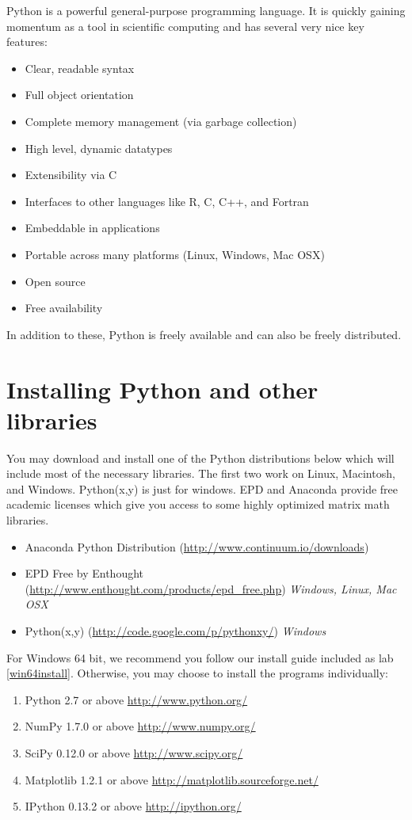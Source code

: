 \label{lab:Essential_Python}

Python is a powerful general-purpose programming language.
It is quickly gaining momentum as a tool in scientific computing and has several very
nice key features:
\begin{itemize}
\item Clear, readable syntax
\item Full object orientation
\item Complete memory management (via garbage collection)
\item High level, dynamic datatypes
\item Extensibility via C
\item Interfaces to other languages like R, C, C++, and Fortran
\item Embeddable in applications
\item Portable across many platforms (Linux, Windows, Mac OSX)
\item Open source
\item Free availability
\end{itemize}
In addition to these, Python is freely available and can also be freely distributed.

\section*{Installing Python and other libraries}

You may download and install one of the Python distributions below which will 
include most of the necessary libraries.
The first two work on Linux, Macintosh, and Windows.
Python(x,y) is just for windows.
EPD and Anaconda provide free academic licenses which give you access to some highly
optimized matrix math libraries.
\begin{itemize}
\item Anaconda Python Distribution (\url{http://www.continuum.io/downloads})
\item EPD Free by Enthought (\url{http://www.enthought.com/products/epd_free.php})
        \emph{Windows, Linux, Mac OSX}
\item Python(x,y) (\url{http://code.google.com/p/pythonxy/}) \emph{Windows}
\end{itemize}
For Windows 64 bit, we recommend you follow our install guide included as lab
\ref{win64install}. Otherwise, you may choose to install the programs individually:
\begin{enumerate}
\item Python 2.7 or above \url{http://www.python.org/}
\item NumPy 1.7.0 or above \url{http://www.numpy.org/}
\item SciPy 0.12.0 or above \url{http://www.scipy.org/}
\item Matplotlib 1.2.1 or above \url{http://matplotlib.sourceforge.net/}
\item IPython 0.13.2 or above \url{http://ipython.org/}
\end{enumerate}


